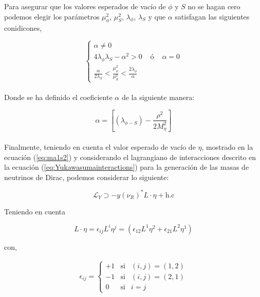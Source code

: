 \documentclass[12pt]{article}
\begin{document}
Para asegurar que los valores esperados de vacío de $\phi$ y $S$ no se hagan cero podemos elegir los parámetros $ \mu^{2}_\phi $, $\mu^{2}_S$, $\lambda_\phi$, $\lambda_S$ y que $\alpha $ satisfagan las siguientes conidicones,

\begin{equation}
    \label{eq:condictions}
      \left \{ \begin{matrix} \alpha \neq 0 \\ 
4\lambda_\phi\lambda_S-\alpha^{2} > 0 & \mbox{ ó }  & \alpha = 0 \\ 
\frac{\alpha}{2\lambda_S} < \frac{\mu^{2}_\phi}{\mu^{2}_S} < \frac{2\lambda_\phi}{\alpha}  
\end{matrix}\right. 
\end{equation} \\



Donde se ha definido el coeficiente $\alpha$ de la siguiente manera: 

\begin{equation}
  \label{eq:alpha}
  \alpha= [({\lambda_{\phi-S}})-\frac{\rho^{2}}{2M^{2}_\eta}]
\end{equation} \\
 
Finalmente, teniendo en cuenta el valor esperado de vacío de $\eta$, mostrado en la ecuación (\ref{eq:ma1s2}) y considerando el lagrangiano de interacciones descrito en la ecuación (\ref{eq:Yukawasumainteractions}) para la generación de las masas de neutrinos de Dirac, podemos considerar lo siguiente:


\begin{equation}
    \label{eq:YukawaLAgran}
    \mathcal{L}_Y \supset  -y (\nu_R)^* {L}\cdot \eta+ \text{h.c}
\end{equation}

Teniendo en cuenta


\[{L}\cdot \eta= \epsilon_{ij}{L}^i \eta^j = ( \epsilon_{12}{L}^1 \eta^2 + \epsilon_{21}{L}^2 \eta^1 ) \]

con, 


\begin{equation}
\begin{aligned}
 \label{eq:Levi-Civita}
    \epsilon_{ij} = \left \{  \begin{matrix} +1 & \text{si} & (i,j) =  (1,2) \\
    -1 & \text{si} & (i,j) =  (2,1) \\
    0 & \text{si} & i = j  
    \end{matrix}\right.
\end{aligned}
\end{equation}
\end{document}
